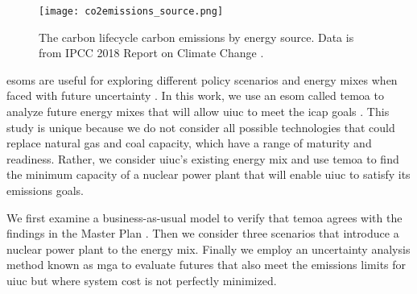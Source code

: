 \begin{figure}[h]
  \centering
  \texttt{[image: co2emissions\_source.png]}
  \caption{The carbon lifecycle carbon emissions by energy source. Data is from
  IPCC 2018 Report on Climate Change \cite{allen_framing_2018}.}
  \label{fig:co2sources}
\end{figure}

 \glspl{esom} are useful for
exploring different policy scenarios and energy mixes when faced with future
uncertainty
\cite{decarolis_modelling_2016,hunter_modeling_2013,li_open_2020,decarolis_multi-stage_nodate}.
In this work, we use an \gls{esom} called \gls{temoa}
to analyze future energy mixes that will allow \gls{uiuc} to meet the
\gls{icap} goals \cite{decarolis_tools_2020}. This study is unique because we do
not consider all possible technologies that could replace natural gas and coal
capacity, which have a range of maturity and readiness. Rather, we
consider \gls{uiuc}'s existing energy mix and use \gls{temoa} to find the
minimum capacity of a nuclear power plant that will enable \gls{uiuc} to
satisfy its emissions goals.

We first examine a business-as-usual model to verify that \gls{temoa} agrees
with the findings in the Master Plan
\cite{affiliated_engineers_inc_utilities_2015}. Then we consider three scenarios
that introduce a nuclear power plant to the energy mix. Finally we employ an
uncertainty analysis method known as \gls{mga} to evaluate futures
that also meet the emissions limits for \gls{uiuc} but where system cost is not
perfectly minimized.
